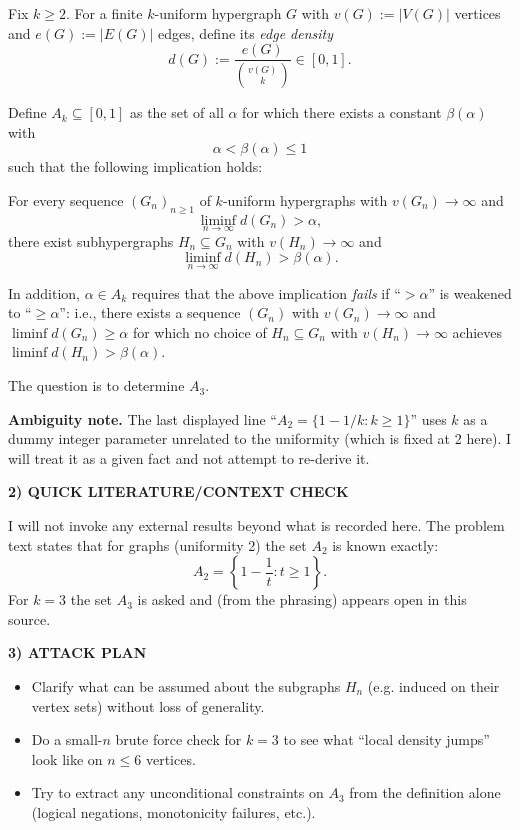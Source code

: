 Fix $k\ge 2$.
For a finite $k$-uniform hypergraph $G$ with $v(G):=|V(G)|$ vertices and $e(G):=|E(G)|$ edges, define its \emph{edge density}
\[
d(G):=\frac{e(G)}{\binom{v(G)}{k}}\in[0,1].
\]

Define $A_k\subseteq[0,1]$ as the set of all $\alpha$ for which there exists a constant $\beta(\alpha)$ with
\[
\alpha<\beta(\alpha)\le 1
\]
such that the following implication holds:

\quad For every sequence $(G_n)_{n\ge 1}$ of $k$-uniform hypergraphs with $v(G_n)\to\infty$ and
\[
\liminf_{n\to\infty} d(G_n) > \alpha,
\]
there exist subhypergraphs $H_n\subseteq G_n$ with $v(H_n)\to\infty$ and
\[
\liminf_{n\to\infty} d(H_n) > \beta(\alpha).
\]

In addition, $\alpha\in A_k$ requires that the above implication \emph{fails} if ``$>\alpha$'' is weakened to ``$\ge\alpha$'': i.e., there exists a sequence $(G_n)$ with $v(G_n)\to\infty$ and $\liminf d(G_n)\ge \alpha$ for which no choice of $H_n\subseteq G_n$ with $v(H_n)\to\infty$ achieves $\liminf d(H_n)>\beta(\alpha)$.

The question is to determine $A_3$.

\textbf{Ambiguity note.} The last displayed line ``$A_2=\{1-1/k:k\ge 1\}$'' uses $k$ as a dummy integer parameter unrelated to the uniformity (which is fixed at 2 here). I will treat it as a given fact and not attempt to re-derive it.

\medskip
\noindent\textbf{2) QUICK LITERATURE/CONTEXT CHECK}

I will not invoke any external results beyond what is recorded here.
The problem text states that for graphs (uniformity 2) the set $A_2$ is known exactly:
\[
A_2 = \left\{ 1-\frac{1}{t} : t\geq 1\right\}.
\]
For $k=3$ the set $A_3$ is asked and (from the phrasing) appears open in this source.

\medskip
\noindent\textbf{3) ATTACK PLAN}

\begin{itemize}
\item Clarify what can be assumed about the subgraphs $H_n$ (e.g. induced on their vertex sets) without loss of generality.
\item Do a small-$n$ brute force check for $k=3$ to see what ``local density jumps'' look like on $n\le 6$ vertices.
\item Try to extract any unconditional constraints on $A_3$ from the definition alone (logical negations, monotonicity failures, etc.).
\end{itemize}

